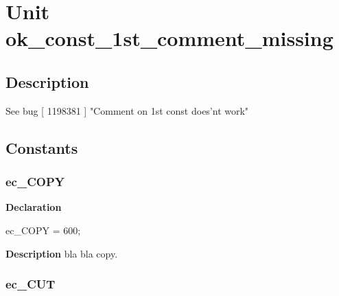 \documentclass{report}
\newif\ifpdf
\begin{document}
\label{toc}\tableofcontents
\newpage
\newlength{\tmplength}
\chapter{Unit ok{\_}const{\_}1st{\_}comment{\_}missing}
\label{ok_const_1st_comment_missing}
\section{Description}
See bug [ 1198381 ] "Comment on 1st const does'nt work"
\section{Constants}
\ifpdf
\subsection*{\large{\textbf{ec{\_}COPY}}\normalsize\hspace{1ex}\hrulefill}
\else
\subsection*{ec{\_}COPY}
\fi
\label{ok_const_1st_comment_missing-ec_COPY}
\begin{list}{}{
\setlength{\itemindent}{0cm}
\setlength{\listparindent}{0cm}
\setlength{\leftmargin}{\evensidemargin}
\addtolength{\leftmargin}{\tmplength}
\settowidth{\labelsep}{X}
\addtolength{\leftmargin}{\labelsep}
\setlength{\labelwidth}{\tmplength}
}
\item[\textbf{Declaration}\hfill]
\ifpdf
\begin{flushleft}
\fi
\begin{ttfamily}
ec{\_}COPY           = 600;\end{ttfamily}

\ifpdf
\end{flushleft}
\fi

\par
\item[\textbf{Description}]
bla bla copy.

\end{list}
\ifpdf
\subsection*{\large{\textbf{ec{\_}CUT}}\normalsize\hspace{1ex}\hrulefill}
\else
\end{document}
